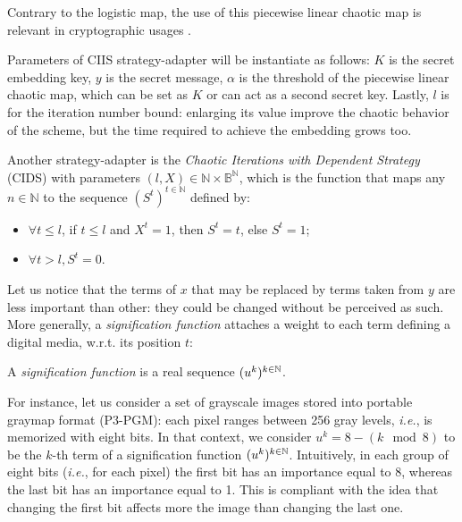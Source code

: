 \documentclass{comjnl}
\begin{document}
Contrary to the logistic map, the use of this piecewise linear chaotic map 
is relevant in cryptographic usages \cite{Arroyo08}.

Parameters of CIIS strategy-adapter will be instantiate as follows: 
$K$ is the secret embedding key, $y$ is the secret message, 
$\alpha$ is the threshold of the piecewise linear chaotic map,
which can be set as $K$ or can act as a second secret key.
Lastly, $l$ is for the iteration number bound:
enlarging its value improve the chaotic behavior of the scheme,
but the time required to achieve the embedding grows too.

Another strategy-adapter is the 
\emph{Chaotic Iterations with Dependent Strategy} (CIDS) 
with parameters $(l,X) \in \mathds{N}\times \mathds{B}^\mathds{N}$, 
which is the function that maps any $ n \in \mathds{N}$ to
the sequence $\left(S^t\right)^{t \in \mathds{N}}$ defined by:
\begin{itemize}
\item $\forall t \leqslant l$, if $t \leqslant l$ and $X^t = 1$, 
  then $S^t=t$, else $S^t=1$;
\item $\forall t > l, S^t = 0$.
\end{itemize}




Let us notice that the terms of $x$ that may be replaced by terms taken
from $y$ are less important than other: they could be changed 
without be perceived as such. More generally, a 
\emph{signification function} 
attaches a weight to each term defining a digital media,
w.r.t. its position $t$:

\begin{definition}
A \emph{signification function} is a real sequence 
$(u^k)^{k \in \mathbb{N}}$. \end{definition}













For instance, let us consider a set of    
grayscale images stored into portable graymap format (P3-PGM):
each pixel ranges between 256 gray levels, \textit{i.e.},
is memorized with eight bits.
In that context, we consider 
$u^k = 8 - (k  \mod  8)$  to be the $k$-th term of a signification function 
$(u^k)^{k \in \mathbb{N}}$. 
Intuitively, in each group of eight bits (\textit{i.e.}, for each pixel) 
the first bit has an importance equal to 8, whereas the last bit has an
importance equal to 1. This is compliant with the idea that
changing the first bit affects more the image than changing the last one.
\end{document}
